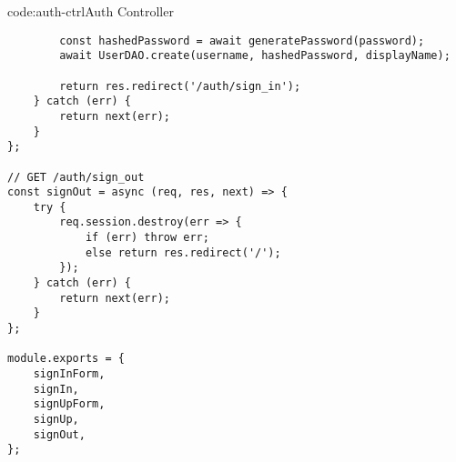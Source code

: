\begin{codeenv}{code:auth-ctrl}{Auth Controller}
\begin{verbatim}
        const hashedPassword = await generatePassword(password);
        await UserDAO.create(username, hashedPassword, displayName);

        return res.redirect('/auth/sign_in');
    } catch (err) {
        return next(err);
    }
};

// GET /auth/sign_out
const signOut = async (req, res, next) => {
    try {
        req.session.destroy(err => {
            if (err) throw err;
            else return res.redirect('/');
        });
    } catch (err) {
        return next(err);
    }
};

module.exports = {
    signInForm,
    signIn,
    signUpForm,
    signUp,
    signOut,
};
\end{verbatim}
\end{codeenv}
